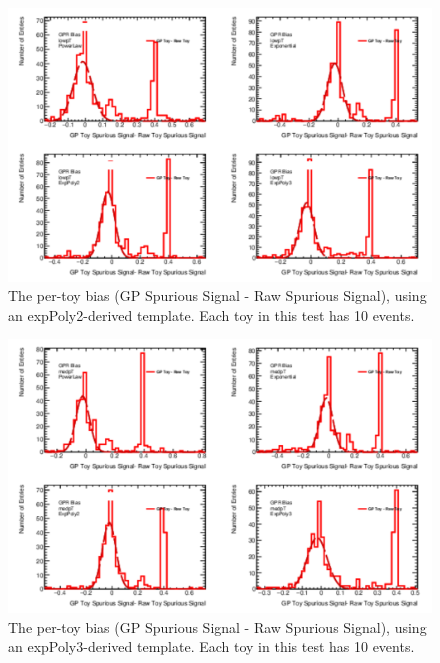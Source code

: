 \begin{figure} 
\begin{center}
  \includegraphics[width=\textwidth]{figures/background/gpr/validation/nominal/ToyTest_FitSigBiases_lowpT_10_noSig}   
\caption{The per-toy bias (GP Spurious Signal - Raw Spurious Signal), using an expPoly2-derived template. Each toy in this test has 10 events.}
\label{fig:bias_lowpt_10_noSig}
\end{center}
\end{figure}

\begin{figure} 
\begin{center}
  \includegraphics[width=\textwidth]{figures/background/gpr/validation/nominal/ToyTest_FitSigBiases_medpT_10_noSig}   
\caption{The per-toy bias (GP Spurious Signal - Raw Spurious Signal), using an expPoly3-derived template. Each toy in this test has 10 events.}
\label{fig:bias_medpt_10_noSig}
\end{center}
\end{figure}

